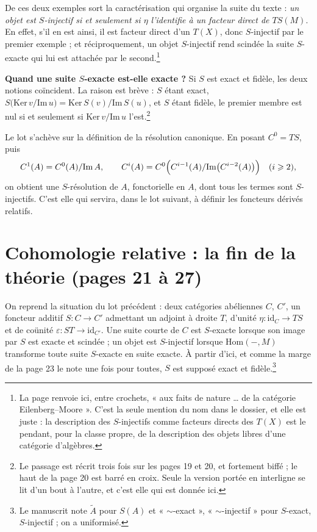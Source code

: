 \documentclass[11pt,a4paper]{article}
\begin{document}
De ces deux exemples sort la caractérisation qui organise la suite du texte :
\emph{un objet est $S$-injectif si et seulement si $\eta$ l'identifie à un
facteur direct de $TS(M)$}. En effet, s'il en est ainsi, il est facteur direct
d'un $T(X)$, donc $S$-injectif par le premier exemple ; et réciproquement, un
objet $S$-injectif rend scindée la suite $S$-exacte qui lui est attachée par le
second.\footnote{La page renvoie ici, entre crochets, « aux faits de nature
… de la catégorie Eilenberg--Moore ». C'est la seule mention du nom dans
le dossier, et elle est juste : la description des $S$-injectifs comme facteurs
directs des $T(X)$ est le pendant, pour la classe propre, de la description des
objets libres d'une catégorie d'algèbres.}


\textbf{Quand une suite $S$-exacte est-elle exacte ?} Si $S$ est exact et
fidèle, les deux notions coïncident. La raison est brève : $S$ étant exact,
$S\bigl( \mathrm{Ker}\,v / \mathrm{Im}\,u \bigr) = \mathrm{Ker}\,S(v) /
\mathrm{Im}\,S(u)$, et $S$ étant fidèle, le premier membre est nul si et
seulement si $\mathrm{Ker}\,v / \mathrm{Im}\,u$ l'est.\footnote{Le passage est
récrit trois fois sur les pages 19 et 20, et fortement biffé ; le haut de la
page 20 est barré en croix. Seule la version portée en interligne se lit d'un
bout à l'autre, et c'est elle qui est donnée ici.}

Le lot s'achève sur la définition de la résolution canonique. En posant
$C^{0} = TS$, puis
\[
  C^{1}(A) = C^{0}(A) / \mathrm{Im}\,A , \qquad
  C^{i}(A) = C^{0}\Bigl( C^{i-1}(A) / \mathrm{Im}\bigl( C^{i-2}(A) \bigr)
  \Bigr) \quad (i \geqslant 2) ,
\]
on obtient une $S$-résolution de $A$, fonctorielle en $A$, dont tous les termes
sont $S$-injectifs. C'est elle qui servira, dans le lot suivant, à définir les
foncteurs dérivés relatifs.

\section*{Cohomologie relative : la fin de la théorie (pages 21 à 27)}

On reprend la situation du lot précédent : deux catégories abéliennes $C$,
$C'$, un foncteur additif $S : C \to C'$ admettant un adjoint à droite $T$,
d'unité $\eta : \mathrm{id}_{C} \to TS$ et de coünité
$\varepsilon : ST \to \mathrm{id}_{C'}$. Une suite courte de $C$ est
$S$-exacte lorsque son image par $S$ est exacte et scindée ; un objet est
$S$-injectif lorsque $\mathrm{Hom}(-, M)$ transforme toute suite $S$-exacte en
suite exacte. À partir d'ici, et comme la marge de la page 23 le note une fois
pour toutes, $S$ est supposé exact et fidèle.\footnote{Le manuscrit note
$\widetilde{A}$ pour $S(A)$ et « $\sim$-exact », « $\sim$-injectif » pour
$S$-exact, $S$-injectif ; on a uniformisé.}
\end{document}
